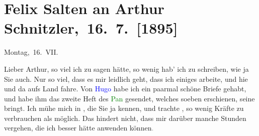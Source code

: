 

\renewcommand{\erwaehntePersonen}{Personen: Richard Beer-Hofmann, Paul Goldmann, Hugo von Hofmannsthal, Charlotte Pohl-Glas, Theodor Zasche}
\renewcommand{\erwaehnteOrte}{Orte: Bad Ischl, Kopenhagen, Skandinavien, Wien}
\renewcommand{\erwaehnteWerke}{Werke: Pan, Quer durch den Wurstelprater, Terzinen, Wiener Allgemeine Zeitung}
\section[ Felix Salten an Arthur Schnitzler, 16. 7. {[}1895{]}]{Felix Salten an Arthur Schnitzler, 16. 7. {[}1895{]}}
\nopagebreak{}
\rehead{ }\normalsize\beginnumbering{}
\toendnotes[C]{\smallbreak\pagebreak[2]}
\toendnotes[C]{\smallbreak}
\pstart
           \raggedleft{}{\pb}Montag, 16. VII.\pend
           
\pstart
           Lieber Arthur, so viel ich zu sagen hätte, so wenig
               hab’ ich zu schreiben, wie ja Sie auch. Nur so viel, dass es mir leidlich geht, dass
               ich einiges arbeite, und hie und da aufs Land fahre. Von \textcolor{blue}{Hugo}{}\ledrightnote{\textcolor{blue}{Hugo von Hofmannsthal}} habe ich ein paarmal schöne Briefe gehabt, und habe ihm
               das zweite Heft des \textcolor{green}{Pan}{}\ledrightnote{\textcolor{green}{Pan}} gesendet, welches soeben
                  {\pb}erschienen, seine \label{K_L03158-1v}\label{K_L03158-1h} bringt. Ich
               mühe mich in \label{K_L03158-2v}\label{K_L03158-2h}, die Sie ja
               kennen, und trachte \strikeout{\textcolor{gray}{nur}}, so wenig Kräfte zu verbrauchen als möglich. Das hindert nicht, dass mir
               darüber manche Stunden vergehen, die ich besser hätte anwenden
                  können\textcolor{gray}{.}\pend
           
